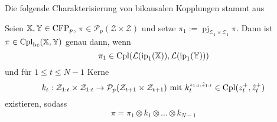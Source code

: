 Die folgende Charakterisierung von bikausalen Kopplungen stammt aus \cite[Lemma A.1]{main_paper}
\begin{lemma} \label{thm:causality_kernel_characterization}
Seien $\mathbb{X}, \mathbb{Y} \in \operatorname{CFP}_p$, $\pi \in \mathcal{P}_p(\mathcal{Z}\times\mathcal{Z})$ und setze $\pi_1 := \operatorname{pj}_{\mathcal{Z}_1\times \mathcal{Z}_1}\pi$. Dann ist $\pi \in \operatorname{Cpl}_{\operatorname{bc}}(\mathbb{X}, \mathbb{Y})$ genau dann, wenn
$$\pi_1 \in \operatorname{Cpl}(\mathcal{L}(\operatorname{ip}_1(\mathbb{X})), \mathcal{L}(\operatorname{ip}_1(\mathbb{Y})))$$
und für $1\leq t \leq N-1$ Kerne
$$k_t:\mathcal{Z}_{1:t} \times \mathcal{Z}_{1:t} \rightarrow \mathcal{P}_p(\mathcal{Z}_{t+1} \times \mathcal{Z}_{t+1}) \text{ mit } k_t^{z_{1:t}, \hat{z}_{1:t}} \in \operatorname{Cpl}(z_t^+, \hat{z}_t^+)$$
existieren, sodass
$$\pi = \pi_1 \otimes k_1 \otimes ... \otimes k_{N-1}$$
\end{lemma}
